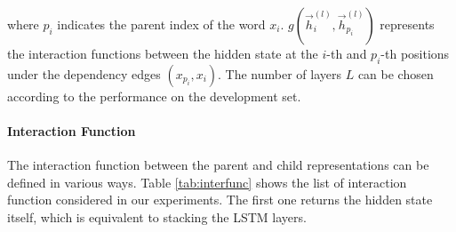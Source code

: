 where $p_i$ indicates the parent index of the word $x_i$. 
$g(\vec{h}_i^{(l)}, \vec{h}_{p_i}^{(l)})$ represents the interaction functions between the hidden state at the $i$-th and  $p_i$-th positions under the dependency edges $(x_{p_i}, x_i)$. 
The number of layers $L$ can be chosen according to the performance on the development set. 



\paragraph{Interaction Function}
The interaction function between the parent and child representations can be defined in various ways. 
Table \ref{tab:interfunc} shows the list of interaction function considered in our experiments. 
The first one returns the hidden state itself, which is equivalent to stacking the LSTM layers. 
\begin{table}[h!]
	\centering
	\caption{List of interaction functions.}
	\label{tab:interfunc}
\end{table}
